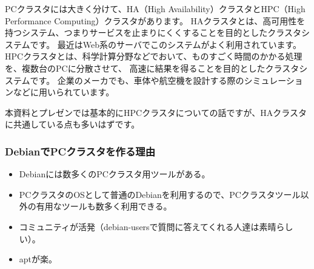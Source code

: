 \documentclass[mingoth,a4paper]{jsarticle}
\begin{document}
PCクラスタには大きく分けて、HA（High Availability）クラスタとHPC（High Performance Computing）クラスタがあります。
HAクラスタとは、高可用性を持つシステム、つまりサービスを止まりにくくすることを目的としたクラスタシステムです。
最近はWeb系のサーバでこのシステムがよく利用されています。
HPCクラスタとは、科学計算分野などでおいて、ものすごく時間のかかる処理を、複数台のPCに分散させて、
高速に結果を得ることを目的としたクラスタシステムです。
企業のメーカでも、車体や航空機を設計する際のシミュレーションなどに用いられています。

本資料とプレゼンでは基本的にHPCクラスタについての話ですが、HAクラスタに共通している点も多いはずです。

\subsubsection{DebianでPCクラスタを作る理由}
\begin{itemize}
\item Debianには数多くのPCクラスタ用ツールがある。
\item PCクラスタのOSとして普通のDebianを利用するので、PCクラスタツール以外の有用なツールも数多く利用できる。
\item コミュニティが活発（debian-usersで質問に答えてくれる人達は素晴らしい）。
\item aptが楽。
\end{itemize}
\end{document}
